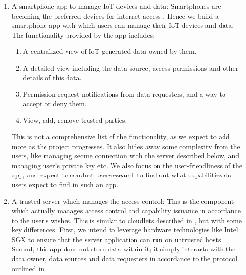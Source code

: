 \begin{enumerate}
	\item A smartphone app to manage IoT devices and data: Smartphones are becoming the preferred devices for internet access \cite{statcount}. Hence we build a smartphone app with which users can manage their IoT devices and data. The functionality provided by the app includes:

	\begin{enumerate}
		\item A centralized view of IoT generated data owned by them.

		\item A detailed view including the data source, access permissions and other details of this data.

		\item Permission request notifications from data requesters, and a way to accept or deny them.

		\item View, add, remove trusted parties.
	\end{enumerate}

	This is not a comprehensive list of the functionality, as we expect to add more as the project progresses. It also hides away some complexity from the users, like managing secure connection with the server described below, and managing user's private key etc. We also focus on the user-friendliness of the app, and expect to conduct user-research to find out what capabilities do users expect to find in such an app.
	
	\item A trusted server which manages the access control: This is the component which actually manages access control and capability issuance in accordance to the user's wishes. This is similar to cloudlets described in \cite{davies}, but with some key differences. First, we intend to leverage hardware technologies like Intel SGX to ensure that the server application can run on untrusted hosts. Second, this app does not store data within it; it simply interacts with the data owner, data sources and data requesters in accordance to the protocol outlined in \cite{campbell}.

	

\end{enumerate}